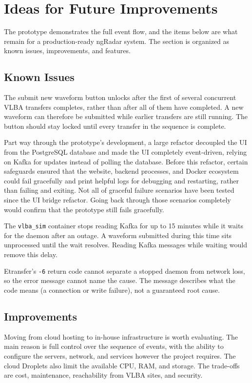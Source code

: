 \documentclass[12pt]{article}
\begin{document}
\section{Ideas for Future Improvements} \label{Future}


  The prototype demonstrates the full event flow, and the items below are what remain for a production-ready ngRadar system. The section is organized as known issues, improvements, and features.

\subsection*{Known Issues}

  The submit new waveform button unlocks after the first of several concurrent VLBA transfers completes, rather than after all of them have completed. A new waveform can therefore be submitted while earlier transfers are still running. The button should stay locked until every transfer in the sequence is complete.

  Part way through the prototype's development, a large refactor decoupled the UI from the PostgreSQL database and made the UI completely event-driven, relying on Kafka for updates instead of polling the database. Before this refactor, certain safeguards ensured that the website, backend processes, and Docker ecosystem could fail gracefully and print helpful logs for debugging and restarting, rather than failing and exiting. Not all of graceful failure scenarios have been tested since the UI bridge refactor. Going back through those scenarios completely would confirm that the prototype still fails gracefully.

  The \texttt{vlba\_sim} container stops reading Kafka for up to 15 minutes while it waits for the daemon after an outage. A waveform submitted during this time sits unprocessed until the wait resolves. Reading Kafka messages while waiting would remove this delay.

  Etransfer's \texttt{-6} return code cannot separate a stopped daemon from network loss, so the error message cannot name the cause. The message describes what the code means (a connection or write failure), not a guaranteed root cause.

\subsection*{Improvements}

  Moving from cloud hosting to in-house infrastructure is worth evaluating. The main reason is full control over the sequence of events, with the ability to configure the servers, network, and services however the project requires. The cloud Droplets also limit the available CPU, RAM, and storage. The trade-offs are cost, maintenance, reachability from VLBA sites, and security.
\end{document}
